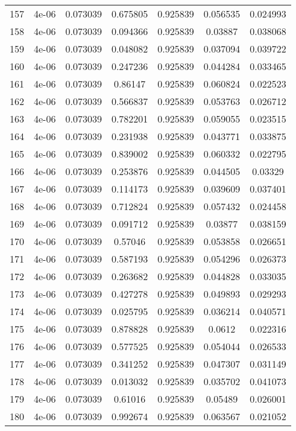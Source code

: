 \begin{table}
\begin{tabular*}{\linewidth}{c|c|c|c|c|c|c}
157 & 4e-06 & 0.073039 & 0.675805 & 0.925839 & 0.056535 & 0.024993\\
158 & 4e-06 & 0.073039 & 0.094366 & 0.925839 & 0.03887 & 0.038068\\
159 & 4e-06 & 0.073039 & 0.048082 & 0.925839 & 0.037094 & 0.039722\\
160 & 4e-06 & 0.073039 & 0.247236 & 0.925839 & 0.044284 & 0.033465\\
161 & 4e-06 & 0.073039 & 0.86147 & 0.925839 & 0.060824 & 0.022523\\
162 & 4e-06 & 0.073039 & 0.566837 & 0.925839 & 0.053763 & 0.026712\\
163 & 4e-06 & 0.073039 & 0.782201 & 0.925839 & 0.059055 & 0.023515\\
164 & 4e-06 & 0.073039 & 0.231938 & 0.925839 & 0.043771 & 0.033875\\
165 & 4e-06 & 0.073039 & 0.839002 & 0.925839 & 0.060332 & 0.022795\\
166 & 4e-06 & 0.073039 & 0.253876 & 0.925839 & 0.044505 & 0.03329\\
167 & 4e-06 & 0.073039 & 0.114173 & 0.925839 & 0.039609 & 0.037401\\
168 & 4e-06 & 0.073039 & 0.712824 & 0.925839 & 0.057432 & 0.024458\\
169 & 4e-06 & 0.073039 & 0.091712 & 0.925839 & 0.03877 & 0.038159\\
170 & 4e-06 & 0.073039 & 0.57046 & 0.925839 & 0.053858 & 0.026651\\
171 & 4e-06 & 0.073039 & 0.587193 & 0.925839 & 0.054296 & 0.026373\\
172 & 4e-06 & 0.073039 & 0.263682 & 0.925839 & 0.044828 & 0.033035\\
173 & 4e-06 & 0.073039 & 0.427278 & 0.925839 & 0.049893 & 0.029293\\
174 & 4e-06 & 0.073039 & 0.025795 & 0.925839 & 0.036214 & 0.040571\\
175 & 4e-06 & 0.073039 & 0.878828 & 0.925839 & 0.0612 & 0.022316\\
176 & 4e-06 & 0.073039 & 0.577525 & 0.925839 & 0.054044 & 0.026533\\
177 & 4e-06 & 0.073039 & 0.341252 & 0.925839 & 0.047307 & 0.031149\\
178 & 4e-06 & 0.073039 & 0.013032 & 0.925839 & 0.035702 & 0.041073\\
179 & 4e-06 & 0.073039 & 0.61016 & 0.925839 & 0.05489 & 0.026001\\
180 & 4e-06 & 0.073039 & 0.992674 & 0.925839 & 0.063567 & 0.021052\\
\end{tabular*}
\end{table}

